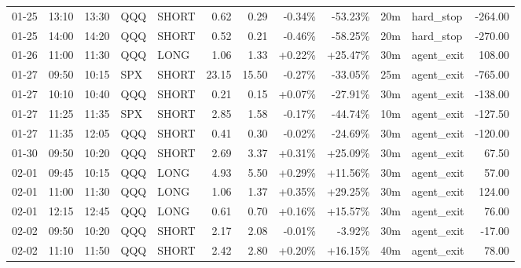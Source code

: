 \documentclass[11pt,a4paper,twoside]{article}
\begin{document}
\begin{center}
\begin{longtable}{>{\color{txtmain}}l l l l l r r r r r >{\color{txtmain}}l r}
01-25 & 13:10 & 13:30 & QQQ & SHORT & 0.62 & 0.29 & \textcolor{lossred}{-0.34\%} & \textcolor{lossred}{-53.23\%} & 20m & hard\_stop & \textcolor{lossred}{-264.00} \\
01-25 & 14:00 & 14:20 & QQQ & SHORT & 0.52 & 0.21 & \textcolor{lossred}{-0.46\%} & \textcolor{lossred}{-58.25\%} & 20m & hard\_stop & \textcolor{lossred}{-270.00} \\
01-26 & 11:00 & 11:30 & QQQ & LONG & 1.06 & 1.33 & \textcolor{wingreen}{+0.22\%} & \textcolor{wingreen}{+25.47\%} & 30m & agent\_exit & \textcolor{wingreen}{108.00} \\
01-27 & 09:50 & 10:15 & SPX & SHORT & 23.15 & 15.50 & \textcolor{lossred}{-0.27\%} & \textcolor{lossred}{-33.05\%} & 25m & agent\_exit & \textcolor{lossred}{-765.00} \\
01-27 & 10:10 & 10:40 & QQQ & SHORT & 0.21 & 0.15 & \textcolor{wingreen}{+0.07\%} & \textcolor{lossred}{-27.91\%} & 30m & agent\_exit & \textcolor{lossred}{-138.00} \\
01-27 & 11:25 & 11:35 & SPX & SHORT & 2.85 & 1.58 & \textcolor{lossred}{-0.17\%} & \textcolor{lossred}{-44.74\%} & 10m & agent\_exit & \textcolor{lossred}{-127.50} \\
01-27 & 11:35 & 12:05 & QQQ & SHORT & 0.41 & 0.30 & \textcolor{lossred}{-0.02\%} & \textcolor{lossred}{-24.69\%} & 30m & agent\_exit & \textcolor{lossred}{-120.00} \\
01-30 & 09:50 & 10:20 & QQQ & SHORT & 2.69 & 3.37 & \textcolor{wingreen}{+0.31\%} & \textcolor{wingreen}{+25.09\%} & 30m & agent\_exit & \textcolor{wingreen}{67.50} \\
02-01 & 09:45 & 10:15 & QQQ & LONG & 4.93 & 5.50 & \textcolor{wingreen}{+0.29\%} & \textcolor{wingreen}{+11.56\%} & 30m & agent\_exit & \textcolor{wingreen}{57.00} \\
02-01 & 11:00 & 11:30 & QQQ & LONG & 1.06 & 1.37 & \textcolor{wingreen}{+0.35\%} & \textcolor{wingreen}{+29.25\%} & 30m & agent\_exit & \textcolor{wingreen}{124.00} \\
02-01 & 12:15 & 12:45 & QQQ & LONG & 0.61 & 0.70 & \textcolor{wingreen}{+0.16\%} & \textcolor{wingreen}{+15.57\%} & 30m & agent\_exit & \textcolor{wingreen}{76.00} \\
02-02 & 09:50 & 10:20 & QQQ & SHORT & 2.17 & 2.08 & \textcolor{lossred}{-0.01\%} & \textcolor{lossred}{-3.92\%} & 30m & agent\_exit & \textcolor{lossred}{-17.00} \\
02-02 & 11:10 & 11:50 & QQQ & SHORT & 2.42 & 2.80 & \textcolor{wingreen}{+0.20\%} & \textcolor{wingreen}{+16.15\%} & 40m & agent\_exit & \textcolor{wingreen}{78.00} \\

\end{longtable}
\end{center}
\end{document}
